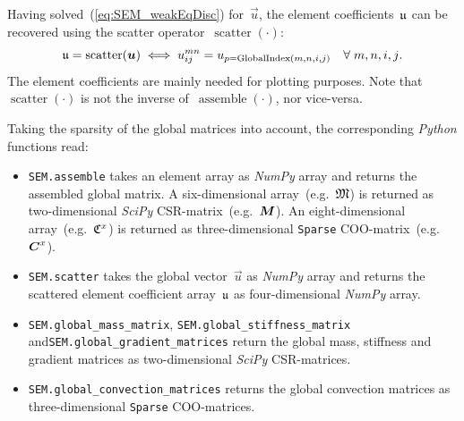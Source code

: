 \documentclass[10pt, ngerman, english,
twoside, open=right,
numbers=noenddot,
declaration=section,
abstract=section,
abstract=multiple,
abstract=notoc,
declaration=notoc,
cd=pale, 
chapterprefix=off, 
chapterpage=false, 
headingsvskip=-10em,
cdgeometry=custom, 
slantedgreek=on,
cdmath=on, 
cdfont=on,
ttfont=false,
mathswap=off,
]{tudscrreprt}
\numberwithin{equation}{chapter}
\newcommand{\sidenote}[1]{
  \leavevmode %
  \marginpar{\hyphenpenalty=1000 \flushleft{\textcolor{HKS41}{#1}}}}
\begin{document}
\sidenote{Scattering}Having solved~(\ref{eq:SEM_weakEqDisc}) for~$\vec{u}$, the element coefficients~$\mathfrak{u}$ can be recovered using the scatter operator~$\operatorname{scatter}(\cdot)$:
\begin{equation}
\emat u = \operatorname{scatter}\left( \vec{u} \right) \iff u^{mn}_{ij} = u_{p=\operatorname{GlobalIndex}(m,n,i,j)}\quad \forall\; m,n,i,j\text{.}
\end{equation}
The element coefficients are mainly needed for plotting purposes. Note that~$\operatorname{scatter}(\cdot)$ is not the inverse of~$\operatorname{assemble}(\cdot)$, nor vice-versa.\par
\sidenote{\textit{Python} Functions}Taking the sparsity of the global matrices into account, the corresponding \textit{Python} functions read:
\begin{itemize}
\item \texttt{SEM.assemble} takes an element array as \textit{NumPy} array and returns the assembled global matrix.
A six-dimensional array~(e.g.~$\mathfrak{M}$) is returned as two-dimensional \textit{SciPy} CSR-matrix~(e.g.~$\boldsymbol{M}$). 
An eight-dimensional array~(e.g.~$\mathfrak{C}^x$) is returned as three-dimensional \texttt{Sparse} COO-matrix~(e.g.~$\boldsymbol{C}^x$). 
\item \texttt{SEM.scatter} takes the global vector~$\vec{u}$ as \textit{NumPy} array and returns the scattered element coefficient array~$\mathfrak{u}$ as four-dimensional \textit{NumPy} array.
\item \texttt{SEM.global\_mass\_matrix}, \texttt{SEM.global\_stiffness\_matrix} and\linebreak \texttt{SEM.global\_gradient\_matrices} return the global mass, stiffness and gradient matrices as two-dimensional \textit{SciPy} CSR-matrices.
\item \texttt{SEM.global\_convection\_matrices} returns the global convection matrices as three-dimensional \texttt{Sparse} COO-matrices.
\end{itemize} 
\end{document}
